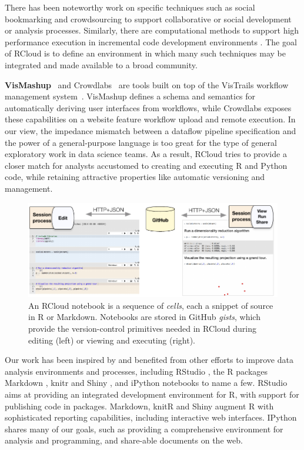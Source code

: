 There has been noteworthy work on specific techniques such as
social bookmarking \cite{Millen:2006:DSB} \cite{Heer:2007:VAV}
and crowdsourcing \cite{Fast:2014:ECS} to support collaborative
or social development or analysis processes.
Similarly, there are computational methods to support high
performance execution in incremental code development
environments \cite{Guo:2010:TPI}.
The goal of RCloud is to define an environment in which many such
techniques may be integrated and made available to a broad community.

{\bf VisMashup}~\cite{Santos:2009:VST} and Crowdlabs~\cite{Mates:2011:CSA}
are tools built on top of the VisTrails workflow management
system~\cite{Callahan:2006:VVM}. VisMashup defines a schema and
semantics for automatically deriving user interfaces from workflows,
while Crowdlabs exposes these capabilities on a website feature
workflow upload and remote execution. In our view, the impedance
mismatch between a dataflow pipeline specification and the power of a
general-purpose language is too great for the type of general
exploratory work in data science teams. As a result, RCloud tries to
provide a closer match for analysts accustomed to creating and
executing R and Python code, while retaining attractive
properties like automatic versioning and management.

\begin{figure}
\centering
\includegraphics[width=.8\linewidth]{fig/notebook/notebook.pdf}
\caption{\label{fig:notebook}An RCloud notebook is a sequence of
  \emph{cells}, each a snippet of source in R or Markdown. Notebooks
  are stored in GitHub \emph{gists}, which provide the version-control
  primitives needed in RCloud during editing (left) or viewing and
  executing (right).}
\end{figure}

Our work has been inspired by and benefited from other efforts
to improve data analysis environments and processes,
including RStudio \cite{RStudio:2013:SWA},
the R packages Markdown \cite{Allaire:2014:MMR},
knitr \cite{Xie:2013:DDW}
and Shiny \cite{RStudio:2013:SWA},
and iPython notebooks \cite{Perez:2007:IAS}
to name a few. RStudio aims at providing an integrated development environment
for R, with support for publishing code in packages. Markdown,
knitR and Shiny augment R with sophisticated reporting capabilities, including
interactive web interfaces. IPython \cite{Perez:2007:IAS}
shares many of our goals, such as providing a comprehensive environment
for analysis and programming, and share-able documents on the web.

